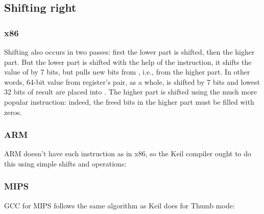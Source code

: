 ﻿\subsection{Shifting right}



\subsubsection{x86}






Shifting also occurs in two passes: first the lower part is shifted, then the higher part.
But the lower part is shifted with the help of the  instruction, it shifts the value of \EAX{} by 7 bits, but pulls new bits
from \EDX{}, i.e., from the higher part.
In other words, 64-bit value from  register's pair, as a whole, is shifted by 7 bits and lowest 32 bits of result are placed into \EAX{}.
The higher part is shifted using the much more popular \SHR{} instruction: indeed, the freed bits in the higher part
must be filled with zeros.

\subsubsection{ARM}

ARM doesn't have such instruction as  in x86, so the Keil compiler ought to do this using simple shifts and  operations:





\subsubsection{MIPS}

GCC for MIPS follows the same algorithm as Keil does for Thumb mode:




